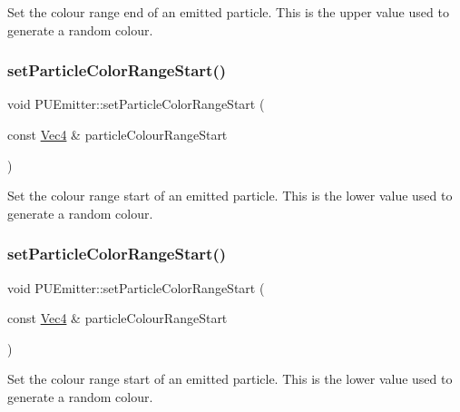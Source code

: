 Set the colour range end of an emitted particle. This is the upper value used to generate a random colour. \mbox{\label{classPUEmitter_a90c804dc0561c3a3f19eb631e1c84646}} 
\subsubsection{\texorpdfstring{set\+Particle\+Color\+Range\+Start()}{setParticleColorRangeStart()}\hspace{0.1cm}{\footnotesize\ttfamily [1/2]}}
{\footnotesize\ttfamily void P\+U\+Emitter\+::set\+Particle\+Color\+Range\+Start (\begin{DoxyParamCaption}\item[{const \hyperlink{classVec4}{Vec4} \&}]{particle\+Colour\+Range\+Start }\end{DoxyParamCaption})}

Set the colour range start of an emitted particle. This is the lower value used to generate a random colour. \mbox{\label{classPUEmitter_a90c804dc0561c3a3f19eb631e1c84646}} 
\subsubsection{\texorpdfstring{set\+Particle\+Color\+Range\+Start()}{setParticleColorRangeStart()}\hspace{0.1cm}{\footnotesize\ttfamily [2/2]}}
{\footnotesize\ttfamily void P\+U\+Emitter\+::set\+Particle\+Color\+Range\+Start (\begin{DoxyParamCaption}\item[{const \hyperlink{classVec4}{Vec4} \&}]{particle\+Colour\+Range\+Start }\end{DoxyParamCaption})}

Set the colour range start of an emitted particle. This is the lower value used to generate a random colour. \mbox{\label{classPUEmitter_a999914161830d3b6cc2cbb6833f196af}} 
